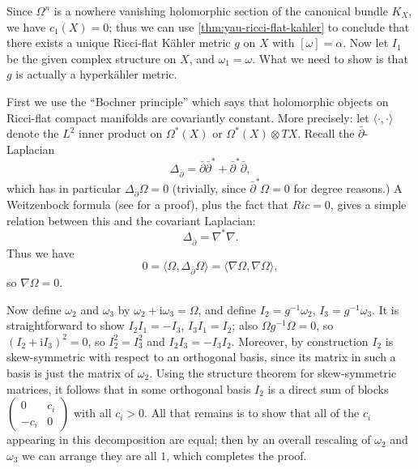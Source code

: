 \documentclass[12pt,letterpaper,reqno]{article}
\numberwithin{equation}{section}
\newcommand{\kahler}{K\"ahler\xspace}
\newcommand{\hk}{hyperk\"ahler\xspace}
\newcommand{\I}{{\mathrm i}}
\newcommand{\IP}[1]{\langle#1\rangle}
\begin{document}
\begin{pf} Since $\Omega^n$ is a nowhere vanishing 
holomorphic section of the canonical bundle $K_X$, 
we have $c_1(X) = 0$; thus we can use
\autoref{thm:yau-ricci-flat-kahler}
to conclude that there exists a unique Ricci-flat \kahler
metric $g$ on $X$ with $[\omega] = \alpha$.
Now let $I_1$ be the given complex structure on $X$,
and $\omega_1 = \omega$.
What we need to show is 
that $g$ is actually a \hk metric.

First we use the ``Bochner principle'' which says that holomorphic
objects on Ricci-flat compact manifolds are covariantly constant. More precisely:
let $\IP{\cdot,\cdot}$ denote the $L^2$ inner product on $\Omega^*(X)$ or 
$\Omega^*(X) \otimes TX$. Recall 
the $\bar\partial$-Laplacian
\begin{equation}
  \Delta_{\bar \partial} = \bar\partial \bar\partial^* + \bar\partial^* \bar\partial,
\end{equation}
which has in particular $\Delta_{\bar \partial} \Omega = 0$ (trivially, since
$\bar\partial^* \Omega = 0$ for degree reasons.)
A Weitzenbock formula (see \cite{MR2325093} for a proof), plus the fact that 
$Ric = 0$, gives a simple relation between this and the covariant Laplacian:
\begin{equation}
\Delta_{\bar\partial} = \nabla^* \nabla.
\end{equation}
Thus we have
\begin{equation}
  0 = \IP{\Omega, \Delta_{\bar \partial} \Omega} = \IP{\nabla\Omega,\nabla\Omega},
\end{equation}
so $\nabla \Omega = 0$. 

Now define $\omega_2$ and $\omega_3$ by
$\omega_2 + \I \omega_3 = \Omega$, and define
$I_2 = g^{-1} \omega_2$, $I_3 = g^{-1} \omega_3$.
It is straightforward to show $I_2 I_1 = -I_3$, $I_3 I_1 = I_2$;
also $\Omega g^{-1} \Omega = 0$, so
$(I_2 + \I I_3)^2 = 0$, so $I_2^2 = I_3^2$ and
$I_2 I_3 = -I_3 I_2$.
Moreover, by construction $I_2$ is skew-symmetric with
respect to an orthogonal basis, since its matrix in such 
a basis is just the matrix of $\omega_2$.
Using the structure theorem 
for skew-symmetric matrices, it follows that in some 
orthogonal basis $I_2$ is a direct sum of blocks
$\begin{pmatrix} 0 & c_i \\ -c_i & 0 \end{pmatrix}$ with all $c_i > 0$.
All that remains is to show that all of the $c_i$
appearing in this decomposition are equal;
then by an overall rescaling of $\omega_2$
and $\omega_3$ we can arrange they are all $1$,
which completes the proof.


\end{pf}
\end{document}
